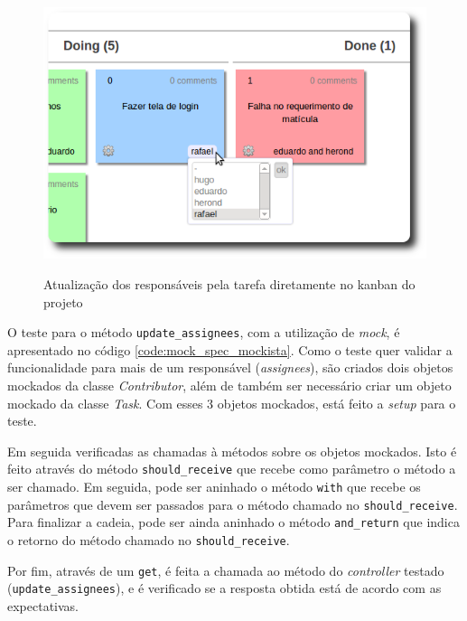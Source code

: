 \begin{figure}[h]
  \center
  \caption{Atualização dos responsáveis pela tarefa diretamente no kanban do projeto}
  \includegraphics[scale=0.55]{images/edit-contributors}
  \label{img:edit-contributors}
\end{figure}

O teste para o método \texttt{update\_assignees}, com a utilização de \textit{mock}, é apresentado no código \ref{code:mock_spec_mockista}. Como o teste quer validar a funcionalidade para mais de um responsável (\textit{assignees}), são criados dois objetos mockados da classe \textit{Contributor}, além de também ser necessário criar um objeto mockado da classe \textit{Task}. Com esses 3 objetos mockados, está feito a \textit{setup} para o teste.

Em seguida verificadas as chamadas à métodos sobre os objetos mockados. Isto é feito através do método \texttt{should\_receive} que recebe como parâmetro o método a ser chamado. Em seguida, pode ser aninhado o método \texttt{with} que recebe os parâmetros que devem ser passados para o método chamado no \texttt{should\_receive}. Para finalizar a cadeia, pode ser ainda aninhado o método \texttt{and\_return} que indica o retorno do método chamado no \texttt{should\_receive}.

Por fim, através de um \texttt{get}, é feita a chamada ao método do \textit{controller} testado (\texttt{update\_assignees}), e é verificado se a resposta obtida está de acordo com as expectativas.

